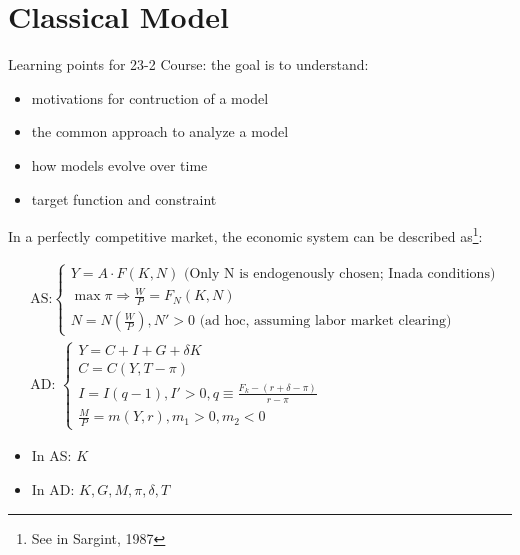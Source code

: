 \section{Classical Model}\label{classical-model}


\begin{greenblock}
Learning points for 23-2 Course: the goal is to understand:

\begin{itemize}
\tightlist
  \item motivations for contruction of a model
  \item the common approach to analyze a model
  \item how models evolve over time
  \item target function and constraint
\end{itemize}

\end{greenblock}

In a perfectly competitive market, the economic system can be described as\footnote{See in Sargint, 1987}:

\begin{align}
&\text{AS:}
\begin{cases}
Y=A\cdot F(K,N)\text{ (Only N is endogenously chosen; Inada conditions)}
\\
\max \pi \Rightarrow \frac{W}{P}=F_{N}(K,N) \\
N=N(\frac{W}{P}),N'>0\text{ (ad hoc, assuming labor market clearing)}\end{cases}
\\
&\text{AD: }
\begin{cases}
Y=C+I+G+\delta K \\
C=C(Y,T-\pi) \\
I=I(q-1), I'>0, q\equiv \frac{F_{k}-(r+\delta-\pi)}{r-\pi} \\
\frac{M}{P}=m(Y,r),m_{1}>0,m_{2}<0
\end{cases}
\end{align}

\begin{blueblock}
\begin{note}
\end{note}
\begin{itemize}
\tightlist
  \item In AS: $K$
  \item In AD: $K, G, M, \pi, \delta, T$
\end{itemize}
\end{blueblock}


